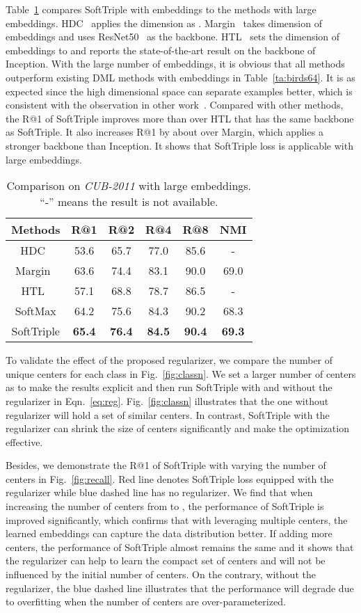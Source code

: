 \documentclass[10pt,twocolumn,letterpaper]{article}
\begin{document}
Table~\ref{ta:birds512} compares SoftTriple with  embeddings to the methods with large embeddings. HDC~\cite{YuanYZ17} applies the dimension as . Margin~\cite{ManmathaWSK17} takes  dimension of embeddings and uses ResNet50~\cite{HeZRS16} as the backbone. HTL~\cite{GeHDS18} sets the dimension of embeddings to  and reports the state-of-the-art result on the backbone of Inception. With the large number of embeddings, it is obvious that all methods outperform existing DML methods with  embeddings in Table~\ref{ta:birds64}. It is as expected since the high dimensional space can separate examples better, which is consistent with the observation in other work~\cite{SongXJS16}. Compared with other methods, the R@1 of SoftTriple improves more than  over HTL that has the same backbone as SoftTriple. It also increases R@1 by about  over Margin, which applies a stronger backbone than Inception. It shows that SoftTriple loss is applicable with large embeddings.

\begin{table}[!ht]
\centering
\small
\caption{Comparison on \textit{CUB-2011} with large embeddings. ``-'' means the result is not available.}\label{ta:birds512}
\begin{tabular}{c|ccccc}
Methods&R@1&R@2&R@4&R@8&NMI\\\hline
HDC~\cite{YuanYZ17}&53.6&65.7&77.0&85.6&-\\
Margin~\cite{ManmathaWSK17}&63.6&74.4&83.1&90.0&69.0\\
HTL~\cite{GeHDS18}&57.1&68.8&78.7&86.5&-\\\hline
SoftMax&64.2&75.6&84.3&90.2&68.3\\
SoftTriple&\textbf{65.4}&\textbf{76.4}&\textbf{84.5}&\textbf{90.4}&\textbf{69.3}\\
\end{tabular}
\end{table}

To validate the effect of the proposed regularizer, we compare the number of unique centers for each class in Fig.~\ref{fig:classn}. We set a larger number of centers as  to make the results explicit and then run SoftTriple with and without the regularizer in Eqn.~\ref{eq:reg}. Fig.~\ref{fig:classn} illustrates that the one without regularizer will hold a set of similar centers. In contrast, SoftTriple with the regularizer can shrink the size of centers significantly and make the optimization effective. 

Besides, we demonstrate the R@1 of SoftTriple with varying the number of centers in Fig.~\ref{fig:recall}. Red line denotes SoftTriple loss equipped with the regularizer while blue dashed line has no regularizer. We find that when increasing the number of centers from  to , the performance of SoftTriple is improved significantly, which confirms that with leveraging multiple centers, the learned embeddings can capture the data distribution better. If adding more centers, the performance of SoftTriple almost remains the same and it shows that the regularizer can help to learn the compact set of centers and will not be influenced by the initial number of centers. On the contrary, without the regularizer, the blue dashed line illustrates that the performance will degrade due to overfitting when the number of centers are over-parameterized.
\end{document}
